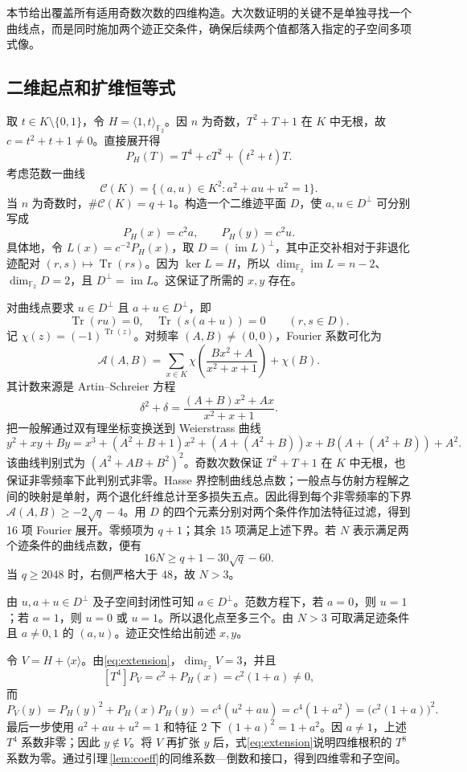 \documentclass[UTF8,a4paper,11pt]{ctexart}
\numberwithin{equation}{section}
\theoremstyle{definition}
\theoremstyle{remark}
\newcommand{\Ftwo}{\mathbb F_2}
\newcommand{\tr}{\operatorname{Tr}}
\newcommand{\dimf}{\dim_{\Ftwo}}
\begin{document}
本节给出覆盖所有适用奇数次数的四维构造。大次数证明的关键不是单独寻找一个曲线点，而是同时施加两个迹正交条件，确保后续两个值都落入指定的子空间多项式像。

\subsection{二维起点和扩维恒等式}

取 $t\in K\setminus\{0,1\}$，令 $H=\langle1,t\rangle_{\Ftwo}$。因 $n$ 为奇数，$T^2+T+1$ 在 $K$ 中无根，故 $c=t^2+t+1\ne0$。直接展开得
\[
 P_H(T)=T^4+cT^2+(t^2+t)T.
\]
考虑范数一曲线
\begin{equation}\label{eq:normcurve}
 \mathcal C(K)=\{(a,u)\in K^2:a^2+au+u^2=1\}.
\end{equation}
当 $n$ 为奇数时，$\#\mathcal C(K)=q+1$。构造一个二维迹平面 $D$，使 $a,u\in D^\perp$ 可分别写成
\[
 P_H(x)=c^2a,\qquad P_H(y)=c^2u.
\]
具体地，令 $L(x)=c^{-2}P_H(x)$，取 $D=(\operatorname{im}L)^\perp$，其中正交补相对于非退化迹配对 $(r,s)\mapsto\tr(rs)$。因为 $\ker L=H$，所以 $\dimf\operatorname{im}L=n-2$、$\dimf D=2$，且 $D^\perp=\operatorname{im}L$。这保证了所需的 $x,y$ 存在。

对曲线点要求 $u\in D^\perp$ 且 $a+u\in D^\perp$，即
\[
 \tr(ru)=0,\quad\tr(s(a+u))=0\qquad(r,s\in D).
\]
记 $\chi(z)=(-1)^{\tr(z)}$。对频率 $(A,B)\ne(0,0)$，Fourier 系数可化为
\[
 \mathcal A(A,B)=\sum_{x\in K}\chi\!\left(\frac{Bx^2+A}{x^2+x+1}\right)+\chi(B).
\]
其计数来源是 Artin--Schreier 方程
\[
 \delta^2+\delta=\frac{(A+B)x^2+Ax}{x^2+x+1}.
\]
把一般解通过双有理坐标变换送到 Weierstrass 曲线
\[
 y^2+xy+By=x^3+(A^2+B+1)x^2+(A+(A^2+B))x+B(A+(A^2+B))+A^2.
\]
该曲线判别式为 $(A^2+AB+B^2)^2$。奇数次数保证 $T^2+T+1$ 在 $K$ 中无根，也保证非零频率下此判别式非零。Hasse 界控制曲线总点数；一般点与仿射方程解之间的映射是单射，两个退化纤维总计至多损失五点。因此得到每个非零频率的下界 $\mathcal A(A,B)\ge-2\sqrt q-4$。用 $D$ 的四个元素分别对两个条件作加法特征过滤，得到 16 项 Fourier 展开。零频项为 $q+1$；其余 15 项满足上述下界。若 $N$ 表示满足两个迹条件的曲线点数，便有
\begin{equation}\label{eq:k4count}
 16N\ge q+1-30\sqrt q-60.
\end{equation}
当 $q\ge2048$ 时，右侧严格大于 $48$，故 $N>3$。

由 $u,a+u\in D^\perp$ 及子空间封闭性可知 $a\in D^\perp$。范数方程下，若 $a=0$，则 $u=1$；若 $a=1$，则 $u=0$ 或 $u=1$。所以退化点至多三个。由 $N>3$ 可取满足迹条件且 $a\ne0,1$ 的 $(a,u)$。迹正交性给出前述 $x,y$。

令 $V=H+\langle x\rangle$。由\eqref{eq:extension}，$\dimf V=3$，并且
\[
 [T^4]P_V=c^2+P_H(x)=c^2(1+a)\ne0,
\]
而
\[
 P_V(y)=P_H(y)^2+P_H(x)P_H(y)
       =c^4(u^2+au)=c^4(1+a^2)=\bigl(c^2(1+a)\bigr)^2.
\]
最后一步使用 $a^2+au+u^2=1$ 和特征 $2$ 下 $(1+a)^2=1+a^2$。因 $a\ne1$，上述 $T^4$ 系数非零；因此 $y\notin V$。将 $V$ 再扩张 $y$ 后，式\eqref{eq:extension}说明四维根积的 $T^8$ 系数为零。通过引理\,\ref{lem:coeff}的同维系数—倒数和接口，得到四维零和子空间。
\end{document}
